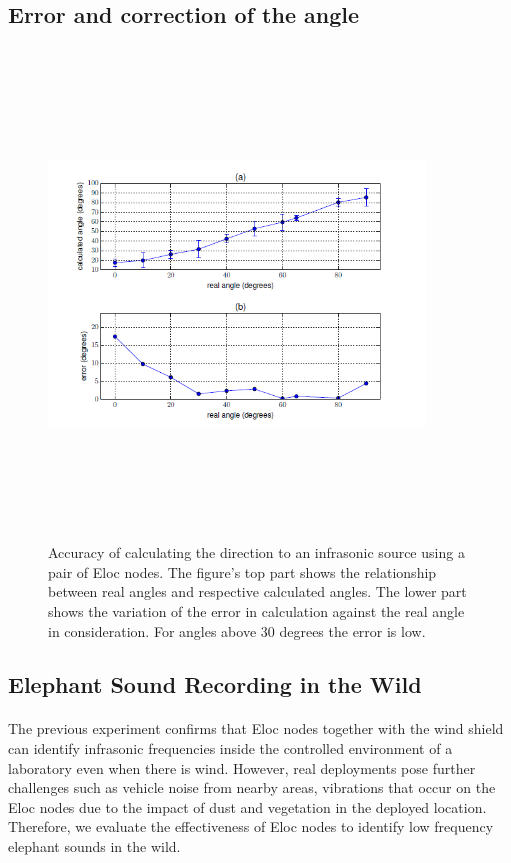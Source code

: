 \documentclass[12pt]{article}
\numberwithin{figure}{section}
\numberwithin{table}{section}
\begin{document}
\newpage
\subsection{Error and correction of the angle}
\begin{figure}[H]
\centering
\includegraphics[width=10cm,height=13cm,keepaspectratio]{error_angles.png}
\caption{Accuracy of calculating the direction to an infrasonic
source using a pair of Eloc nodes. The figure’s top
part shows the relationship between real angles and respective
calculated angles. The lower part shows the variation of
the error in calculation against the real angle in consideration.
For angles above 30 degrees the error is low.}
\label{d:p7}
\end{figure}


\subsection{Elephant Sound Recording in the Wild}

\paragraph{}
The previous experiment confirms that Eloc nodes together with the wind shield can identify infrasonic frequencies inside the controlled environment of a laboratory even when there is wind. However, real deployments pose further challenges such as vehicle noise from nearby areas, vibrations that occur on the Eloc nodes due to the impact of dust and vegetation in the deployed location. Therefore, we evaluate the effectiveness of Eloc nodes to identify low frequency elephant sounds in the wild.
\end{document}
